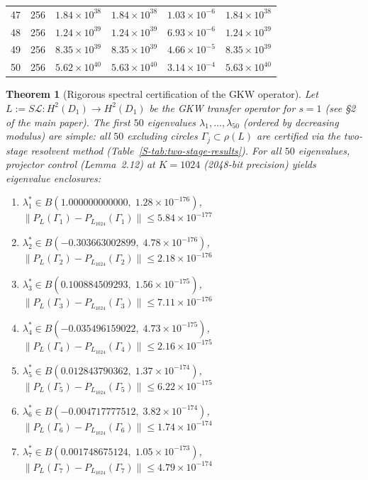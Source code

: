 \documentclass[11pt]{article}
\newtheorem{theorem}{Theorem}
\begin{document}
\begin{longtable}{rlrrrr}
47 & 256 & $1.84 \times 10^{38}$ & $1.84 \times 10^{38}$ & $1.03 \times 10^{-6}$ & $1.84 \times 10^{38}$ \\
48 & 256 & $1.24 \times 10^{39}$ & $1.24 \times 10^{39}$ & $6.93 \times 10^{-6}$ & $1.24 \times 10^{39}$ \\
49 & 256 & $8.35 \times 10^{39}$ & $8.35 \times 10^{39}$ & $4.66 \times 10^{-5}$ & $8.35 \times 10^{39}$ \\
50 & 256 & $5.62 \times 10^{40}$ & $5.63 \times 10^{40}$ & $3.14 \times 10^{-4}$ & $5.63 \times 10^{40}$ \\
\bottomrule
\end{longtable}

\begin{theorem}[Rigorous spectral certification of the GKW operator]
\label{S-thm:two-stage}
Let $L := S\mathcal L : H^2(D_1) \to H^2(D_1)$ be the GKW transfer operator for $s=1$
(see \S2 of the main paper).  The first $50$ eigenvalues $\lambda_1, \ldots, \lambda_{50}$
(ordered by decreasing modulus) are simple: all $50$ excluding circles
$\Gamma_j \subset \rho(L)$ are certified via the two-stage resolvent method
(Table~\ref{S-tab:two-stage-results}).  For all $50$ eigenvalues,
projector control (Lemma~2.12) at $K = 1024$ (2048-bit precision)
yields eigenvalue enclosures:
\begin{enumerate}
\item $\lambda_{1}^* \in B(1.000000000000,\; 1.28 \times 10^{-176})$, \quad $\|P_L(\Gamma_{1}) - P_{L_{1024}}(\Gamma_{1})\| \leq 5.84 \times 10^{-177}$
\item $\lambda_{2}^* \in B(-0.303663002899,\; 4.78 \times 10^{-176})$, \quad $\|P_L(\Gamma_{2}) - P_{L_{1024}}(\Gamma_{2})\| \leq 2.18 \times 10^{-176}$
\item $\lambda_{3}^* \in B(0.100884509293,\; 1.56 \times 10^{-175})$, \quad $\|P_L(\Gamma_{3}) - P_{L_{1024}}(\Gamma_{3})\| \leq 7.11 \times 10^{-176}$
\item $\lambda_{4}^* \in B(-0.035496159022,\; 4.73 \times 10^{-175})$, \quad $\|P_L(\Gamma_{4}) - P_{L_{1024}}(\Gamma_{4})\| \leq 2.16 \times 10^{-175}$
\item $\lambda_{5}^* \in B(0.012843790362,\; 1.37 \times 10^{-174})$, \quad $\|P_L(\Gamma_{5}) - P_{L_{1024}}(\Gamma_{5})\| \leq 6.22 \times 10^{-175}$
\item $\lambda_{6}^* \in B(-0.004717777512,\; 3.82 \times 10^{-174})$, \quad $\|P_L(\Gamma_{6}) - P_{L_{1024}}(\Gamma_{6})\| \leq 1.74 \times 10^{-174}$
\item $\lambda_{7}^* \in B(0.001748675124,\; 1.05 \times 10^{-173})$, \quad $\|P_L(\Gamma_{7}) - P_{L_{1024}}(\Gamma_{7})\| \leq 4.79 \times 10^{-174}$

\end{enumerate}
\end{theorem}
\end{document}
